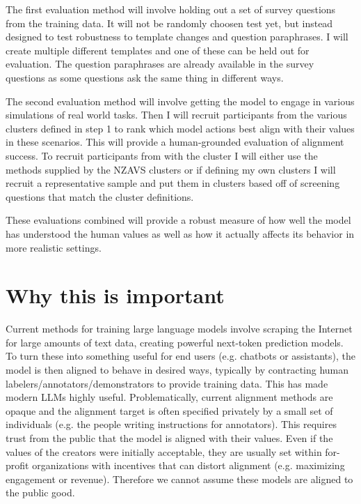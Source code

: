 The first evaluation method will involve holding out a set of survey questions from the training data. It will not be randomly choosen test yet, but instead designed to test robustness to template changes and question paraphrases. I will create multiple different templates and one of these can be held out for evaluation. The question paraphrases are already available in the survey questions as some questions ask the same thing in different ways.

The second evaluation method will involve getting the model to engage in various simulations of real world tasks. Then I will recruit participants from the various clusters defined in step 1 to rank which model actions best align with their values in these scenarios. This will provide a human-grounded evaluation of alignment success. To recruit participants from with the cluster I will either use the methods supplied by the NZAVS clusters or if defining my own clusters I will recruit a representative sample and put them in clusters based off of screening questions that match the cluster definitions.

These evaluations combined will provide a robust measure of how well the model has understood the human values as well as how it actually affects its behavior in more realistic settings.

\section{Why this is important}

Current methods for training large language models involve scraping the Internet for large amounts of text data, creating powerful next-token prediction models. To turn these into something useful for end users (e.g. chatbots or assistants), the model is then aligned to behave in desired ways, typically by contracting human labelers/annotators/demonstrators to provide training data. This has made modern LLMs highly useful.
Problematically, current alignment methods are opaque and the alignment target is often specified privately by a small set of individuals (e.g. the people writing instructions for annotators). This requires trust from the public that the model is aligned with their values. Even if the values of the creators were initially acceptable, they are usually set within for-profit organizations with incentives that can distort alignment (e.g. maximizing engagement or revenue). Therefore we cannot assume these models are aligned to the public good.

